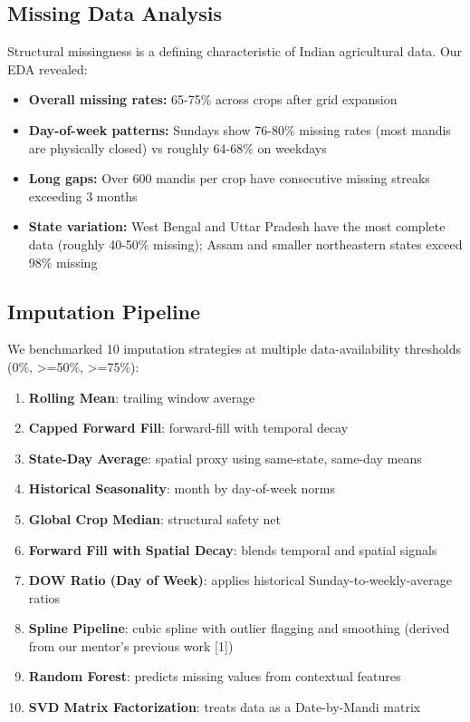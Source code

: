 \documentclass[12pt]{article}
\begin{document}
\subsection{Missing Data Analysis}

Structural missingness is a defining characteristic of Indian agricultural data. Our EDA revealed:

\begin{itemize}
\item \textbf{Overall missing rates:} 65-75\% across crops after grid expansion
\item \textbf{Day-of-week patterns:} Sundays show 76-80\% missing rates (most mandis are physically closed) vs roughly 64-68\% on weekdays
\item \textbf{Long gaps:} Over 600 mandis per crop have consecutive missing streaks exceeding 3 months
\item \textbf{State variation:} West Bengal and Uttar Pradesh have the most complete data (roughly 40-50\% missing); Assam and smaller northeastern states exceed 98\% missing
\end{itemize}

\subsection{Imputation Pipeline}

We benchmarked 10 imputation strategies at multiple data-availability thresholds (0\%, >=50\%, >=75\%):

\begin{enumerate}
\item \textbf{Rolling Mean}: trailing window average
\item \textbf{Capped Forward Fill}: forward-fill with temporal decay
\item \textbf{State-Day Average}: spatial proxy using same-state, same-day means
\item \textbf{Historical Seasonality}: month by day-of-week norms
\item \textbf{Global Crop Median}: structural safety net
\item \textbf{Forward Fill with Spatial Decay}: blends temporal and spatial signals
\item \textbf{DOW Ratio (Day of Week)}: applies historical Sunday-to-weekly-average ratios
\item \textbf{Spline Pipeline}: cubic spline with outlier flagging and smoothing (derived from our mentor's previous work [1])
\item \textbf{Random Forest}: predicts missing values from contextual features
\item \textbf{SVD Matrix Factorization}: treats data as a Date-by-Mandi matrix
\end{enumerate}
\end{document}
